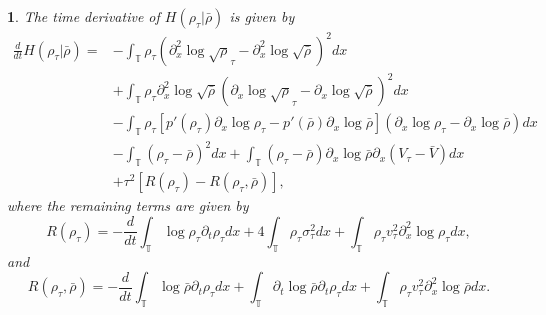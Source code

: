 \documentclass[leqno]{amsart}
\theoremstyle{plain}
\theoremstyle{definition}
\theoremstyle{remark}
\theoremstyle{plain}
\theoremstyle{plain}
\newtheorem{prop}[thm]{\protect\propositionname}
\providecommand{\propositionname}{Proposition}
\def\T{{\mathbb T}}%
\def\d{{\partial}}
\numberwithin{equation}{section}
\begin{document}
\begin{prop}\label{prop:6.2}
The time derivative of $H(\rho_\tau|\bar\rho)$ is given by
\begin{equation}\label{eq:dtrlentr}
\begin{aligned}
\frac{d}{dt}H(\rho_\tau|\bar\rho)=&-\int_\T\rho_\tau(\d_x^2\log\sqrt\rho_\tau-\d_x^2\log\sqrt{\bar\rho})^2dx\\
&+\int_\T \rho_\tau\d_x^2\log\sqrt{\bar\rho}(\d_x\log\sqrt\rho_\tau-\d_x\log\sqrt{\bar\rho})^2dx\\
&-\int_\T \rho_\tau[p'(\rho_\tau)\d_x\log\rho_\tau-p'(\bar\rho)\d_x\log\bar\rho](\d_x\log\rho_\tau-\d_x\log\bar\rho) dx\\
&-\int_\T(\rho_\tau-\bar\rho)^2dx+\int_\T(\rho_\tau-\bar\rho)\d_x\log\bar\rho\d_x(V_\tau-\bar V)dx\\
&+\tau^2[R(\rho_\tau)-R(\rho_\tau,\bar\rho)],
\end{aligned}
\end{equation}
where the remaining terms are given by
\[
R(\rho_\tau)=-\frac{d}{dt}\int_\T\log\rho_\tau\d_t\rho_\tau dx+4\int_\T\rho_\tau\sigma_\tau^2 dx+\int_\T\rho_\tau v_\tau^2\d_x^2\log\rho_\tau dx,
\]
and
\[
R(\rho_\tau,\bar\rho)=-\frac{d}{dt}\int_\T\log\bar\rho\d_t\rho_\tau dx+\int_\T\d_t\log\bar\rho\d
_t\rho_\tau dx+\int_\T\rho_\tau v_\tau^2\d_x^2\log\bar\rho dx.
\]
\end{prop}
\end{document}
